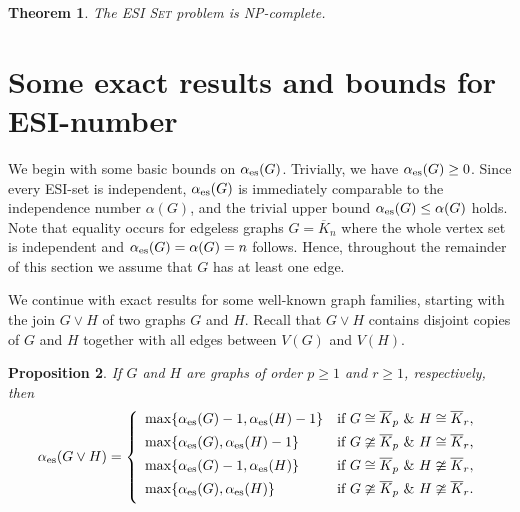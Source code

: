 \documentclass[11pt]{article}
\newtheorem{theorem}{Theorem}
\newtheorem{proposition}[theorem]{Proposition}
\newcommand{\es}{\alpha_{\rm es}}
\newcommand{\ip}[1]{{\color{blue}#1}}%
\begin{document}
\begin{theorem} 
\label{complex}
The \textsc{ESI Set} problem is NP-complete.
\end{theorem}


\section{Some exact results and bounds for ESI-number}
\label{num}

We begin with some basic bounds on $\es(G)$. Trivially, we have $\es(G)\geq 0$. Since every ESI-set is independent, 
$\es(G)$ is immediately comparable to the independence number $\alpha(G)$, and the trivial upper bound
$\es(G)\le \alpha(G)$ holds. Note that equality occurs for edgeless graphs $G=\overline{K}_n$ where the
whole vertex set is independent and $\es(G)=\alpha(G)=n$ follows. Hence, throughout the remainder of this section we assume that $G$ has at least one edge.

We continue with exact results for some well-known graph families, starting with the join $G\vee H$ of two graphs $G$ and $H$. Recall that $G\vee H$ contains disjoint copies of $G$ and $H$ together with all edges between $V(G)$ and $V(H)$. 


\begin{proposition}
\label{join}
If $G$ and $H$ are graphs of order $p\geq 1$ and $r\geq 1$, respectively, then 
\begin{equation*}
\es(G\vee H)=\left\{\begin{array}{ll}
\max\{\es(G)-1,\es(H)-1\} & \mbox{if } G\cong \overline{K}_p\ \&\ H\cong \overline{K}_r, \\[0.15cm]
\max\{\es(G),\es(H)-1\} & \mbox{if } G\ncong \overline{K}_p\ \&\ H\cong \overline{K}_r, \\[0.15cm]
\max\{\es(G)-1,\es(H)\} & \mbox{if } G\cong \overline{K}_p\ \&\  H\ncong \overline{K}_r, \\[0.15cm]
\max\{\es(G),\es(H)\} & \mbox{if }  G\ncong \overline{K}_p\ \&\  H\ncong \overline{K}_r. \\[0.15cm]
\end{array}\right.
\end{equation*}
\end{proposition}
\end{document}

